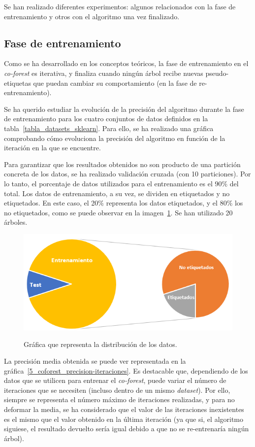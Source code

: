 Se han realizado diferentes experimentos: algunos relacionados con la fase de entrenamiento y otros con el algoritmo una vez finalizado.

\subsection{Fase de entrenamiento}

Como se ha desarrollado en los conceptos teóricos, la fase de entrenamiento en el \textit{co-forest} es iterativa, y finaliza cuando ningún árbol recibe nuevas pseudo-etiquetas que puedan cambiar su comportamiento (en la fase de re-entrenamiento).

Se ha querido estudiar la evolución de la precisión del algoritmo durante la fase de entrenamiento para los cuatro conjuntos de datos definidos en la tabla~\ref{tabla_datasets_sklearn}. Para ello, se ha realizado una gráfica comprobando cómo evoluciona la precisión del algoritmo en función de la iteración en la que se encuentre.

Para garantizar que los resultados obtenidos no son producto de una partición concreta de los datos, se ha realizado validación cruzada (con 10 particiones). Por lo tanto, el porcentaje de datos utilizados para el entrenamiento es el $90\%$ del total. Los datos de entrenamiento, a su vez, se dividen en etiquetados y no etiquetados. En este caso, el 20\% representa los datos etiquetados, y el 80\% los no etiquetados, como se puede observar en la imagen~\ref{5_entrenamiento_particiones}. Se han utilizado 20 árboles.

\begin{figure}[h]
	\caption{Gráfica que representa la distribución de los datos.}
	\centering
	\includegraphics[width=\textwidth]{../img/memoria/5_entrenamiento_particiones}
	\label{5_entrenamiento_particiones}
\end{figure}


 La precisión media obtenida se puede ver representada en la gráfica~\ref{5_coforest_precision-iteraciones}. Es destacable que, dependiendo de los datos que se utilicen para entrenar el \textit{co-forest}, puede variar el número de iteraciones que se necesiten (incluso dentro de un mismo \textit{dataset}). Por ello, siempre se representa el número máximo de iteraciones realizadas, y para no deformar la media, se ha considerado que el valor de las iteraciones inexistentes es el mismo que el valor obtenido en la última iteración (ya que si, el algoritmo siguiese, el resultado devuelto sería igual debido a que no se re-entrenaría ningún árbol).

